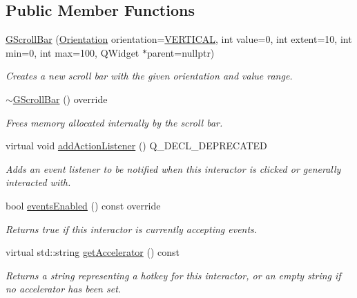 \subsection*{Public Member Functions}
\begin{DoxyCompactItemize}
\item 
\mbox{\hyperlink{classGScrollBar_aed316f3139eb0a6e80da4d1dcf171a43}{G\+Scroll\+Bar}} (\mbox{\hyperlink{classGScrollBar_a871118a09520247c78a71ecd7b0abd58}{Orientation}} orientation=\mbox{\hyperlink{classGScrollBar_a871118a09520247c78a71ecd7b0abd58a1a88641fcd39f2ed3e58a18526e97138}{V\+E\+R\+T\+I\+C\+AL}}, int value=0, int extent=10, int min=0, int max=100, Q\+Widget $\ast$parent=nullptr)
\begin{DoxyCompactList}\small\item\em Creates a new scroll bar with the given orientation and value range. \end{DoxyCompactList}\item 
\mbox{\hyperlink{classGScrollBar_a0b1ea2ea7b58f299e20c6d75249f1a2e}{$\sim$\+G\+Scroll\+Bar}} () override
\begin{DoxyCompactList}\small\item\em Frees memory allocated internally by the scroll bar. \end{DoxyCompactList}\item 
virtual void \mbox{\hyperlink{classGInteractor_a02f20ea6edfa0671f31c4c648a253833}{add\+Action\+Listener}} () Q\+\_\+\+D\+E\+C\+L\+\_\+\+D\+E\+P\+R\+E\+C\+A\+T\+ED
\begin{DoxyCompactList}\small\item\em Adds an event listener to be notified when this interactor is clicked or generally interacted with. \end{DoxyCompactList}\item 
bool \mbox{\hyperlink{classGInteractor_a597a370b592e3737d38d9d2f4e2031ea}{events\+Enabled}} () const override
\begin{DoxyCompactList}\small\item\em Returns true if this interactor is currently accepting events. \end{DoxyCompactList}\item 
virtual std\+::string \mbox{\hyperlink{classGInteractor_a69f8d23ed8f207fbecad99960776e942}{get\+Accelerator}} () const
\begin{DoxyCompactList}\small\item\em Returns a string representing a hotkey for this interactor, or an empty string if no accelerator has been set. \end{DoxyCompactList}\item 

\end{DoxyCompactItemize}
